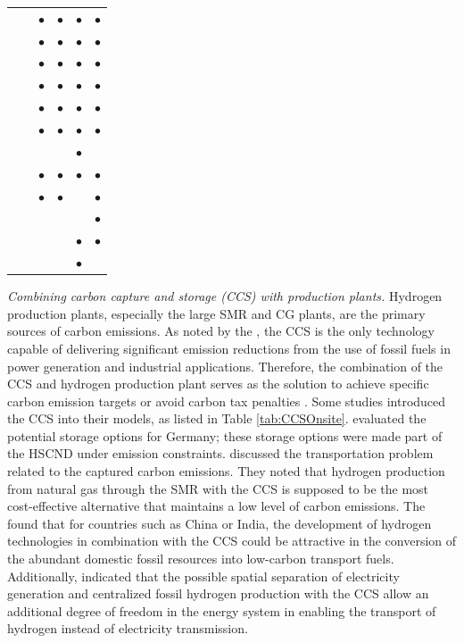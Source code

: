 \documentclass[11pt,3p]{elsarticle}
\begin{document}
\begin{table}[!htbp]
\begin{tabular}{llcccc}
\citet{kim2008strategic} &  & $\bullet$ & $\bullet$ & $\bullet$ & $\bullet$ \\
\citet{kim2008optimization} &  & $\bullet$ & $\bullet$ & $\bullet$ & $\bullet$ \\
\citet{konda2011optimal} &  & $\bullet$ & $\bullet$ & $\bullet$ & $\bullet$ \\
\citet{moreno2017towards} &  & $\bullet$ & $\bullet$ & $\bullet$ & $\bullet$ \\
\citet{nunes2015design} &  & $\bullet$ & $\bullet$ & $\bullet$ & $\bullet$ \\
\citet{ogumerem2017multi} &  & $\bullet$ & $\bullet$ & $\bullet$ & $\bullet$ \\
\citet{parker2010waste} &  &  &  & $\bullet$ &  \\
\citet{sabio2010strategic} &  & $\bullet$ & $\bullet$ & $\bullet$ & $\bullet$ \\
\citet{sabio2012holistic} &  & $\bullet$ & $\bullet$ &  & $\bullet$ \\
\citet{samsatli2016optimal} &  &  &  &  & $\bullet$ \\
\citet{won2017design} &  &  &  & $\bullet$ & $\bullet$ \\
\citet{woo2016optimization} &  &  &  & $\bullet$ &  \\ \hline
\end{tabular}
\end{table}

\textit{Combining carbon capture and storage (CCS) with production plants.} Hydrogen production plants, especially the large SMR and CG plants, are the primary sources of carbon emissions. As noted by the \citet{iea2016years}, the CCS is the only technology capable of delivering significant emission reductions from the use of fossil fuels in power generation and industrial applications. Therefore, the combination of the CCS and hydrogen production plant serves as the solution to achieve specific carbon emission targets or avoid carbon tax penalties \citep{almansoori2016design}. Some studies introduced the CCS into their models, as listed in Table \ref{tab:CCSOnsite}. \citet{almansoori2016design} evaluated the potential storage options for Germany; these storage options were made part of the HSCND under emission constraints. \citet{moreno2017towards} discussed the transportation problem related to the captured carbon emissions. They noted that hydrogen production from natural gas through the SMR with the CCS is supposed to be the most cost-effective alternative that maintains a low level of carbon emissions. The \citet{iea2015technology} found that for countries such as China or India, the development of hydrogen technologies in combination with the CCS could be attractive in the conversion of the abundant domestic fossil resources into low-carbon transport fuels. Additionally, \citet{baufume2011carbon} indicated that the possible spatial separation of electricity generation and centralized fossil hydrogen production with the CCS allow an additional degree of freedom in the energy system in enabling the transport of hydrogen instead of electricity transmission.
\end{document}
